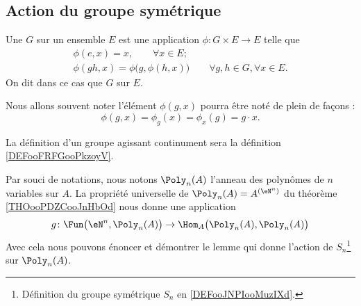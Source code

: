 \subsection{Action du groupe symétrique}

\begin{definition}  \label{DefActionGroupe}
	Une  \( G\) sur un ensemble \( E\) est une application \(\phi \colon G\times E\to E  \) telle que
	\begin{gather*}
		\phi(e,x)=x, \hspace{2em} \forall x \in E;\\
		\phi(gh,x)=\phi\big( g,\phi(h,x) \big)  \hspace{2em} \forall g,h \in G, \forall x \in E.
	\end{gather*}
	On dit dans ce cas que \( G \)  sur \( E \).

	Nous allons souvent noter l'élément \( \phi(g,x)\) pourra être noté de plein de façons :
	\begin{equation}
		\phi(g,x)=\phi_g(x)=\phi_x(g)=g\cdot x.
	\end{equation}
\end{definition}
La définition d'un groupe agissant continument sera la définition \ref{DEFooFRFGooPkzoyV}.

Par souci de notations, nous notons \( \Poly_n(A)\) l'anneau des polynômes de \( n\) variables sur \( A\). La propriété universelle de \( \Poly_n(A)=A^{(\eN^n)}\) du théorème \ref{THOooPDZCooJnHbOd} nous donne une application
\begin{equation}
	g\colon \Fun\big(\eN^n,\Poly_n(A)\big)\to \Hom_A\big( \Poly_n(A),\Poly_n(A) \big)
\end{equation}
Avec cela nous pouvons énoncer et démontrer le lemme qui donne l'action de \( S_n\)\footnote{Définition du groupe symétrique \( S_n\) en \ref{DEFooJNPIooMuzIXd}.} sur \( \Poly_n(A)\).

